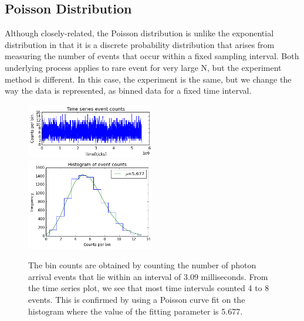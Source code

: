 \documentclass[authoryear, 12pt,5p, times]{elsarticle}
\begin{document}
 	\subsection{Poisson Distribution}
 	Although closely-related, the Poisson distribution is unlike the exponential distribution in that it is a discrete probability distribution that arises from measuring the number of events that occur within a fixed sampling interval. Both underlying process applies to rare event for very large N, but the experiment method is different. In this case, the experiment is the same, but we change the way the data is represented, as binned data for a fixed time interval.
 	 	\begin{figure}[h]
			\includegraphics[width=0.5\textwidth]{figures/time_series}
			\includegraphics[width=0.5\textwidth]{figures/poisson_histo}
			\caption{The bin counts are obtained by counting the number of photon arrival events that lie within an interval of 3.09 milliseconds. From the time series plot, we see that most time intervals counted 4 to 8 events. This is confirmed by using a Poisson curve fit on the histogram where the value of the fitting parameter is 5.677.}
			\label{poisson}
		\end{figure}
\end{document}
